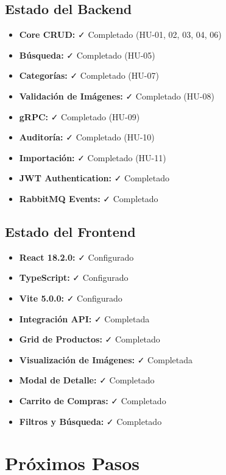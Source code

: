 \documentclass[12pt,a4paper]{article}
\begin{document}
\subsection{Estado del Backend}

\begin{itemize}
    \item \textbf{Core CRUD:} ✓ Completado (HU-01, 02, 03, 04, 06)
    \item \textbf{Búsqueda:} ✓ Completado (HU-05)
    \item \textbf{Categorías:} ✓ Completado (HU-07)
    \item \textbf{Validación de Imágenes:} ✓ Completado (HU-08)
    \item \textbf{gRPC:} ✓ Completado (HU-09)
    \item \textbf{Auditoría:} ✓ Completado (HU-10)
    \item \textbf{Importación:} ✓ Completado (HU-11)
    \item \textbf{JWT Authentication:} ✓ Completado
    \item \textbf{RabbitMQ Events:} ✓ Completado
\end{itemize}

\subsection{Estado del Frontend}

\begin{itemize}
    \item \textbf{React 18.2.0:} ✓ Configurado
    \item \textbf{TypeScript:} ✓ Configurado
    \item \textbf{Vite 5.0.0:} ✓ Configurado
    \item \textbf{Integración API:} ✓ Completada
    \item \textbf{Grid de Productos:} ✓ Completado
    \item \textbf{Visualización de Imágenes:} ✓ Completada
    \item \textbf{Modal de Detalle:} ✓ Completado
    \item \textbf{Carrito de Compras:} ✓ Completado
    \item \textbf{Filtros y Búsqueda:} ✓ Completado
\end{itemize}

\section{Próximos Pasos}
\end{document}
